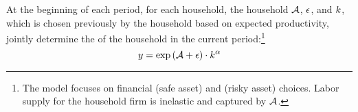 \label{subsec:modeltwo}

At the beginning of each period, for each household, the household \PDT \(\mathcal{A}\), \SKE \(\epsilon\), and \PYS \(k\), which is chosen previously by the household based on expected productivity, jointly determine the \ICM of the household in the current period:\footnote{The model focuses on financial (safe asset) and \PYS  (risky asset) choices. Labor supply for the household firm is inelastic and captured by \(\mathcal{A}\).}
\begin{equation}
  \label{eq:ProductionFunction}
  y=\exp\left(\mathcal{A}+\epsilon\right)\cdot k^{\alpha}
\end{equation}
